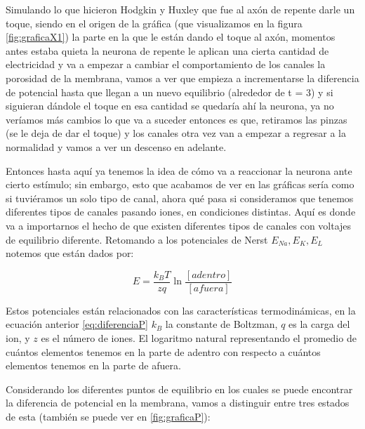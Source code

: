 Simulando lo que hicieron Hodgkin y Huxley que fue al axón de repente darle un toque, siendo en el origen de la gráfica (que visualizamos en la figura \ref{fig:graficaX1}) la parte en la que le están dando el toque al axón, momentos antes estaba quieta la neurona de repente le aplican una cierta cantidad de electricidad y va a empezar a cambiar el comportamiento de los canales la porosidad de la membrana, vamos a ver que empieza a incrementarse la diferencia de potencial hasta que llegan a un nuevo equilibrio (alrededor de t = 3) y si siguieran dándole el toque en esa cantidad se quedaría ahí la neurona, ya no veríamos más cambios lo que va a suceder entonces es que, retiramos las pinzas (se le deja de dar el toque) y los canales otra vez van a empezar a regresar a la normalidad y vamos a ver un descenso en adelante.

Entonces hasta aquí ya tenemos la idea de cómo va a reaccionar la neurona ante cierto estímulo; sin embargo, esto que acabamos de ver en las gráficas sería como si tuviéramos un solo tipo de canal, ahora qué pasa si consideramos que tenemos diferentes tipos de canales pasando iones, en condiciones distintas. 
Aquí es donde va a importarnos el hecho de que existen diferentes tipos de canales con voltajes de equilibrio diferente. 
Retomando a los potenciales de Nerst \(E_{Na},E_{K},E_{L}\) notemos que están dados por:


\begin{equation}
    E = \dfrac{k_{B}T}{zq}\ln\dfrac{[adentro]}{[afuera]}
 \label{eq:diferenciaP}
\end{equation}

Estos potenciales están relacionados con las características termodinámicas, en la ecuación anterior \ref{eq:diferenciaP} \(k_{B}\) la constante de Boltzman, \(q\) es la carga del ion, y \(z\) es el número de iones. El logaritmo natural representando el promedio de cuántos elementos tenemos en la parte de adentro con respecto a cuántos elementos tenemos en la parte de afuera.

Considerando los diferentes puntos de equilibrio en los cuales se puede encontrar la diferencia de potencial en la membrana, vamos a distinguir entre tres estados de esta (también se puede ver en \ref{fig:graficaP}):

